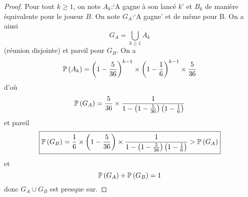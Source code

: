 \begin{proof}
    Pour tout $k\geqslant1$, on note $A_{k}$:`A gagne à son lancé $k$' et $B_{k}$ de manière équivalente pour le joueur $B$. On note $G_{A}$:`A gagne' et de même pour B. On a ainsi
    \begin{equation}
        G_{A}=\bigcup_{k\geqslant 1}A_{k}
    \end{equation}
    (réunion disjointe) et pareil pour $G_{B}$. On a 
    \begin{equation}
        \P\left(A_{k}\right)=\left(1-\frac{5}{36}\right)^{k-1}\times\left(1-\frac{1}{6}\right)^{k-1}\times\frac{5}{36}
    \end{equation}
    d'où 
    \begin{equation}
        \P\left(G_{A}\right)=\frac{5}{36}\times\frac{1}{1-\left(1-\frac{5}{36}\right)\left(1-\frac{1}{6}\right)}
    \end{equation}
    et pareil 
    \begin{equation}
        \boxed{\P\left(G_{B}\right)=\frac{1}{6}\times\left(1-\frac{5}{36}\right)\times\frac{1}{1-\left(1-\frac{5}{36}\right)\left(1-\frac{1}{6}\right)}>\P\left(G_{A}\right)}
    \end{equation}
    et 
    \begin{equation}
        \P\left(G_{A}\right)+\P\left(G_{B}\right)=1
    \end{equation}
    donc $G_{A}\cup G_{B}$ est presque sur.
\end{proof}

